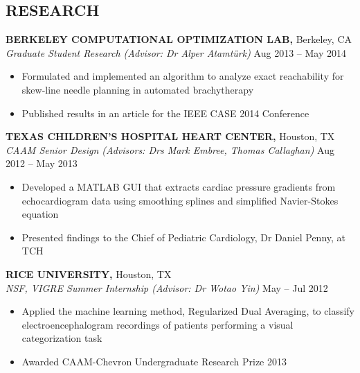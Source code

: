 \documentclass[margin]{res}
\begin{document}
\begin{resume}
\section{RESEARCH}
{\bf BERKELEY COMPUTATIONAL OPTIMIZATION LAB,} Berkeley, CA \\
{\em Graduate Student Research (Advisor: Dr Alper Atamt\"urk)} \hfill
Aug 2013 -- May 2014 \\                                          \vspace{-4mm}
\begin{itemize}                                         \itemsep1pt %
        \item    Formulated and implemented an algorithm to analyze exact reachability for skew-line needle planning in automated brachytherapy
        \item    Published results in an article for the IEEE CASE 2014 Conference
\end{itemize}
\vspace{-2mm}

{\bf TEXAS CHILDREN'S HOSPITAL HEART CENTER,} Houston, TX \\
{\em CAAM Senior Design (Advisors: Drs Mark Embree, Thomas Callaghan)} \hfill
Aug 2012 -- May 2013 \\                                          \vspace{-4mm}
\begin{itemize}                                         \itemsep1pt %
        \item  Developed a MATLAB GUI that extracts cardiac pressure gradients from echocardiogram data using smoothing splines and simplified Navier-Stokes equation 
        \item  Presented findings to the Chief of Pediatric Cardiology, Dr Daniel Penny, at TCH
\end{itemize}
\vspace{-2mm}

{\bf RICE UNIVERSITY,} Houston, TX \\
{\em NSF, VIGRE Summer Internship (Advisor: Dr Wotao Yin)}    \hfill
May -- Jul 2012 \\                                          \vspace{-4mm}
\begin{itemize}                                         \itemsep1pt 
        \item  Applied the machine learning method, Regularized Dual Averaging, to classify electroencephalogram  recordings of patients performing a visual categorization task
        \item Awarded CAAM-Chevron Undergraduate Research Prize
2013\end{itemize}
\vspace{-2mm}


\end{resume}
\end{document}

